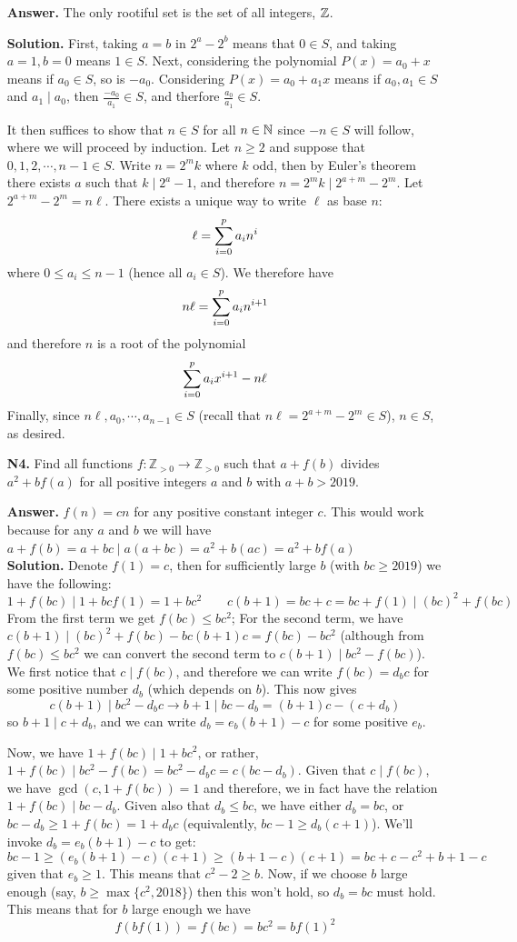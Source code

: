 \documentclass[11pt,a4paper]{article}
\begin{document}
\begin{enumerate}
	\textbf{Answer.} The only rootiful set is the set of all integers, $\bbZ$. 
	
	\textbf{Solution.} First, taking $a=b$ in $2^a-2^b$ means that $0\in S$, and taking $a=1, b=0$ means $1\in S$. Next, considering the polynomial $P(x)=a_0+x$ means if $a_0\in S$, so is $-a_0$. Considering $P(x)=a_0+a_1x$ means if $a_0, a_1\in S$ and $a_1\mid a_0$, then $\frac{-a_0}{a_1}\in S$, and therfore $\frac{a_0}{a_1}\in S$. 
	
	It then suffices to show that $n\in S$ for all $n\in\bbN$ since $-n\in S$ will follow, where we will proceed by induction. Let $n\ge 2$ and suppose that $0, 1, 2, \cdots , n-1\in S$.
	Write $n=2^mk$ where $k$ odd, then by Euler's theorem there exists $a$ such that $k\mid 2^a-1$, and therefore $n=2^mk\mid 2^{a+m}-2^m$. Let $2^{a+m}-2^m=n\ell$. There exists a unique way to write $\ell$ as base $n$: 
	\[
	\ell = \dsum_{i=0}^{p}a_in^i
	\]
	where $0\le a_i\le n-1$ (hence all $a_i\in S$). We therefore have 
	\[
	n\ell =  \dsum_{i=0}^{p}a_in^{i+1}
	\]
	and therefore $n$ is a root of the polynomial 
	\[
	\dsum_{i=0}^{p}a_ix^{i+1}-n\ell
	\]
	Finally, since $n\ell, a_0, \cdots , a_{n-1}\in S$ (recall that $n\ell=2^{a+m}-2^m\in S$), $n\in S$, as desired. 
	
	\item[\textbf{N4.}] Find all functions $f:\mathbb Z_{>0}\to \mathbb Z_{>0}$ such that $a+f(b)$ divides $a^2+bf(a)$ for all positive integers $a$ and $b$ with $a+b>2019$.
	
	\textbf{Answer.} $f(n)=cn$ for any positive constant integer $c$. This would work because for any $a$ and $b$ we will have $a+f(b)=a+bc\mid a(a+bc)=a^2+b(ac)=a^2+bf(a)$\\
	\textbf{Solution.} Denote $f(1)=c$, then for sufficiently large $b$ (with $bc\ge 2019$) we have the following: 
	\[
	1+f(bc)\mid 1+bcf(1)=1+bc^2\qquad c(b+1)=bc+c=bc+f(1)\mid (bc)^2+f(bc)
	\]
	From the first term we get $f(bc)\le bc^2$; 
	For the second term, we have $c(b+1)\mid (bc)^2+f(bc)-bc(b+1)c=f(bc)-bc^2$ (although from $f(bc)\le bc^2$ we can convert the second term to $c(b+1)\mid bc^2-f(bc)$). 
	We first notice that $c\mid f(bc)$, and therefore we can write $f(bc)=d_bc$ for some positive number $d_b$ (which depends on $b$). This now gives 
	\[
	c(b+1)\mid bc^2-d_bc\to b+1\mid bc-d_b=(b+1)c-(c+d_b)
	\] 
	so $b+1\mid c+d_b$, and we can write $d_b=e_b(b+1)-c$ for some positive $e_b$. 
	
	Now, we have $1+f(bc)\mid 1+bc^2$, or rather, $1+f(bc)\mid bc^2-f(bc)=bc^2-d_bc=c(bc-d_b)$. Given that $c\mid f(bc)$, we have $\gcd(c, 1+f(bc))=1$ and therefore, we in fact have the relation $1+f(bc)\mid bc-d_b$. Given also that $d_b\le bc$, we have either $d_b=bc$, or $bc-d_b\ge 1+f(bc)=1+d_bc$ (equivalently, $bc-1\ge d_b(c+1)$). 
	We'll invoke $d_b=e_b(b+1)-c$ to get: 
	\[
	bc -1 \ge (e_b(b+1)-c)(c+1)\ge (b+1-c)(c+1)=bc+c-c^2+b+1-c
	\]
	given that $e_b\ge 1$. This means that $c^2-2\ge b$. Now, if we choose $b$ large enough (say, $b\ge \max\{c^2, 2018\}$) then this won't hold, so $d_b=bc$ must hold. This means that for $b$ large enough we have 
	\[
	f(bf(1))=f(bc)=bc^2=bf(1)^2
	\]
	

\end{enumerate}
\end{document}

